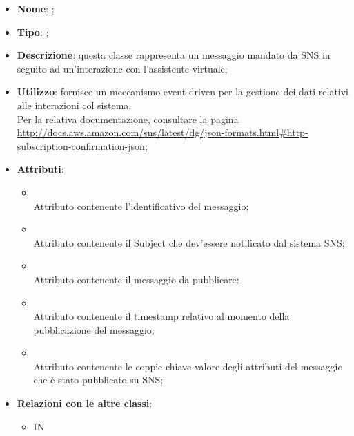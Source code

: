 \begin{itemize}
	\item \textbf{Nome}: ;
	\item \textbf{Tipo}: ;
	\item \textbf{Descrizione}: questa classe rappresenta un messaggio mandato da SNS in seguito ad un'interazione con l'assistente virtuale;
	\item \textbf{Utilizzo}: fornisce un meccanismo event-driven per la gestione dei dati relativi alle interazioni col sistema.\\
Per la relativa documentazione, consultare la pagina \url{http://docs.aws.amazon.com/sns/latest/dg/json-formats.html#http-subscription-confirmation-json};
	\item \textbf{Attributi}:
	\begin{itemize}
		\item[]  \\
		Attributo contenente l'identificativo del messaggio;
		\item[]  \\
		Attributo contenente il Subject che dev'essere notificato dal sistema SNS;
		\item[]  \\
		Attributo contenente il messaggio da pubblicare;
		\item[]  \\
		Attributo contenente il timestamp relativo al momento della pubblicazione del messaggio;
		\item[]  \\
		Attributo contenente le coppie chiave-valore degli attributi del messaggio che è stato pubblicato su SNS;
	\end{itemize}
	\item \textbf{Relazioni con le altre classi}:
	\begin{itemize}
		\item IN \hyperlink{SNSRecord_label}{}
	\end{itemize}
\end{itemize}
\FloatBarrier

